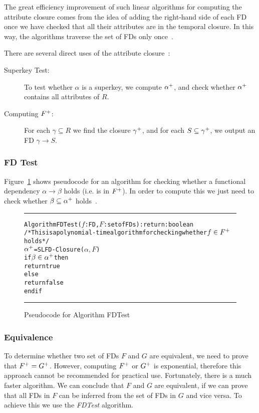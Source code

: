 The great efficiency improvement of such linear algorithms for computing the attribute closure
comes from the idea of adding the right-hand side of each FD once we have checked that
all their attributes are in the temporal closure. In
this way, the algorithms traverse the set of FDs
only once~\cite{p10}.

There are several direct uses of the attribute closure~\cite[Section 7.4]{bdb4}:
\begin{description}
    \item[Superkey Test:] To test whether $\alpha$ is a superkey, we compute $\alpha\sp{+}$, and check whether $\alpha\sp{+}$ contains all attributes of $R$.
    \item[Computing $F\sp{+}$:] For each $\gamma \subseteq R$ we find the closure $\gamma\sp{+}$, and for each $S \subseteq \gamma\sp{+}$, we output an FD $\gamma \rightarrow S$.
\end{description}

\subsubsection{FD Test}
Figure~\ref{fig:fdtest} shows pseudocode for an algorithm for checking 
whether a functional dependency $\alpha \rightarrow \beta $ 
holds (i.e. is in $F\sp{+}$). In order to compute this we just need to check 
whether $\beta \subseteq \alpha\sp{+}$ holds~\cite[Section 7.4]{bdb4}.
  
\begin{figure}[htbp]
\hrule
\vspace{0.25cm}
\begin{alltt}
Algorithm FDTest(\(f\): FD, \(F\): set of FDs): return: boolean
/*This is a polynomial-time algorithm for checking whether \(f \in F\sp{+}\) holds*/
  \(\alpha\sp{+}\) = SLFD-Closure(\(\alpha, F\))   
  if \(\beta \in \alpha\sp{+}\) then
    return true
  else
    return false
  end if
\end{alltt}
\caption{Pseudocode for Algorithm FDTest}\label{fig:fdtest}
\hrule
\end{figure}

\subsubsection{Equivalence}
To determine whether two set of FDs $F$ and $G$ are equivalent, we need to prove that $F\sp{+} = G\sp{+}$. 
However, computing $F\sp{+}$ or
$G\sp{+}$ is exponential, therefore this approach cannot be recommended for practical use.
Fortunately, there is a much faster algorithm. We can conclude that $F$ and $G$ are
equivalent, if we can prove that all FDs in $F$ can be inferred from the set of FDs in $G$ and vice
versa. To achieve this we use the \textit{FDTest} algorithm.

